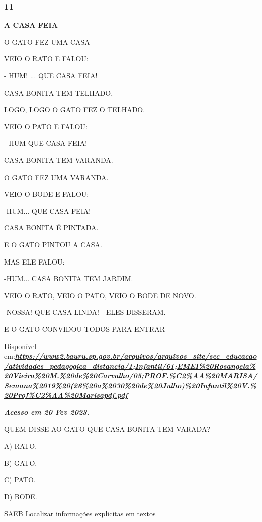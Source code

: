 \begin{escola}
\subsubsection{11}\label{section-51}

\textbf{A CASA FEIA}

O GATO FEZ UMA CASA

VEIO O RATO E FALOU:

- HUM! ... QUE CASA FEIA!

CASA BONITA TEM TELHADO,

LOGO, LOGO O GATO FEZ O TELHADO.

VEIO O PATO E FALOU:

- HUM QUE CASA FEIA!

CASA BONITA TEM VARANDA.

O GATO FEZ UMA VARANDA.

VEIO O BODE E FALOU:

-HUM... QUE CASA FEIA!

CASA BONITA É PINTADA.

E O GATO PINTOU A CASA.

MAS ELE FALOU:

-HUM... CASA BONITA TEM JARDIM.

VEIO O RATO, VEIO O PATO, VEIO O BODE DE NOVO.

-NOSSA! QUE CASA LINDA! - ELES DISSERAM.

E O GATO CONVIDOU TODOS PARA ENTRAR

Disponível
em:\href{https://www2.bauru.sp.gov.br/arquivos/arquivos_site/sec_educacao/atividades_pedagogica_distancia/1;Infantil/61;EMEI\%20Rosangela\%20Vieira\%20M.\%20de\%20Carvalho/05;PROF.\%C2\%AA\%20MARISA/Semana\%2019\%20(26\%20a\%2030\%20de\%20Julho)\%20Infantil\%20V.\%20Prof\%C2\%AA\%20Marisapdf.pdf}{\textbf{\emph{https://www2.bauru.sp.gov.br/arquivos/arquivos\_site/sec\_educacao/atividades\_pedagogica\_distancia/1;Infantil/61;EMEI\%20Rosangela\%20Vieira\%20M.\%20de\%20Carvalho/05;PROF.\%C2\%AA\%20MARISA/Semana\%2019\%20(26\%20a\%2030\%20de\%20Julho)\%20Infantil\%20V.\%20Prof\%C2\%AA\%20Marisapdf.pdf}}}

\textbf{\emph{Acesso em 20 Fev 2023.}}

QUEM DISSE AO GATO QUE CASA BONITA TEM VARADA?

A) RATO.

B) GATO.

C) PATO.

D) BODE.

\protect\hypertarget{_heading=h.28h4qwu}{}{}SAEB Localizar informações
explicitas em textos


\end{escola}
